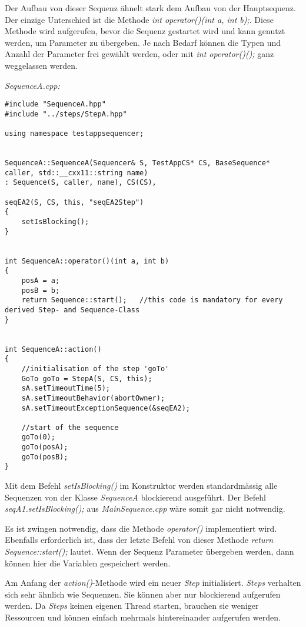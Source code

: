 Der Aufbau von dieser Sequenz ähnelt stark dem Aufbau von der Hauptsequenz.
Der einzige Unterschied ist die Methode \textit{int operator()(int a, int b);}.
Diese Methode wird aufgerufen, bevor die Sequenz gestartet wird und kann genutzt werden, um Parameter zu übergeben.
Je nach Bedarf können die Typen und Anzahl der Parameter frei gewählt werden, oder mit \textit{int operator()();} ganz weggelassen werden.


\textit{SequenceA.cpp:}\
\begin{lstlisting}
#include "SequenceA.hpp"
#include "../steps/StepA.hpp"

using namespace testappsequencer;


SequenceA::SequenceA(Sequencer& S, TestAppCS* CS, BaseSequence* caller, std::__cxx11::string name)
: Sequence(S, caller, name), CS(CS),

seqEA2(S, CS, this, "seqEA2Step")
{
	setIsBlocking();
}


int SequenceA::operator()(int a, int b)
{
	posA = a;
	posB = b;
	return Sequence::start();	//this code is mandatory for every derived Step- and Sequence-Class
}


int SequenceA::action()
{
	//initialisation of the step 'goTo'
	GoTo goTo = StepA(S, CS, this);
	sA.setTimeoutTime(5);
 	sA.setTimeoutBehavior(abortOwner);
	sA.setTimeoutExceptionSequence(&seqEA2);
	
	//start of the sequence
	goTo(0);
	goTo(posA);
	goTo(posB);
}

\end{lstlisting}

Mit dem Befehl \textit{setIsBlocking()} im Konstruktor werden standardmässig alle Sequenzen von der Klasse \textit{SequenceA} blockierend ausgeführt.
Der Befehl \textit{seqA1.setIsBlocking();} aus \textit{MainSequence.cpp} wäre somit gar nicht notwendig.

Es ist zwingen notwendig, dass die Methode \textit{operator()} implementiert wird.
Ebenfalls erforderlich ist, dass der letzte Befehl von dieser Methode \textit{return Sequence::start();}  lautet.
Wenn der Sequenz Parameter übergeben werden, dann können hier die Variablen gespeichert werden.

Am Anfang der \textit{action()}-Methode wird ein neuer \textit{Step} initialisiert.
\textit{Steps} verhalten sich sehr ähnlich wie Sequenzen.
Sie können aber nur blockierend aufgerufen werden.
Da \textit{Steps} keinen eigenen Thread starten, brauchen sie weniger Ressourcen und können einfach mehrmals hintereinander aufgerufen werden.



